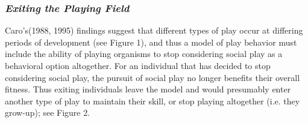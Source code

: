 \documentclass[12pt, letterpaper, fleqn]{article}
\begin{document}
    \subsubsection*{\it Exiting the Playing Field}
      Caro's(1988, 1995) findings suggest that different types of play occur at differing periods of development (see Figure 1), and thus a model of play behavior must include the ability of playing organisms to stop considering social play as a behavioral option altogether.
      For an individual that has decided to stop considering social play, the pursuit of social play no longer benefits their overall fitness.
      Thus exiting individuals leave the model and would presumably enter another type of play to maintain their skill, or stop playing altogether (i.e. they grow-up); see Figure 2.\\ %
\end{document}
